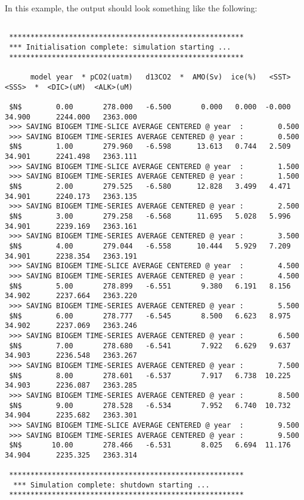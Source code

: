 \documentclass[11pt,fleqn]{book} %
\begin{document}
In this example, the output should look something like the following:

\newpage

\footnotesize
\begin{verbatim}

 *******************************************************
 *** Initialisation complete: simulation starting ...
 *******************************************************
    
      model year  * pCO2(uatm)   d13CO2  *  AMO(Sv)  ice(%)   <SST>   <SSS>  *  <DIC>(uM)  <ALK>(uM)
  
 $N$        0.00       278.000   -6.500       0.000   0.000  -0.000  34.900      2244.000   2363.000
 >>> SAVING BIOGEM TIME-SLICE AVERAGE CENTERED @ year  :        0.500
 >>> SAVING BIOGEM TIME-SERIES AVERAGE CENTERED @ year :        0.500
 $N$        1.00       279.960   -6.598      13.613   0.744   2.509  34.901      2241.498   2363.111
 >>> SAVING BIOGEM TIME-SLICE AVERAGE CENTERED @ year  :        1.500
 >>> SAVING BIOGEM TIME-SERIES AVERAGE CENTERED @ year :        1.500
 $N$        2.00       279.525   -6.580      12.828   3.499   4.471  34.901      2240.173   2363.135
 >>> SAVING BIOGEM TIME-SERIES AVERAGE CENTERED @ year :        2.500
 $N$        3.00       279.258   -6.568      11.695   5.028   5.996  34.901      2239.169   2363.161
 >>> SAVING BIOGEM TIME-SERIES AVERAGE CENTERED @ year :        3.500
 $N$        4.00       279.044   -6.558      10.444   5.929   7.209  34.901      2238.354   2363.191
 >>> SAVING BIOGEM TIME-SLICE AVERAGE CENTERED @ year  :        4.500
 >>> SAVING BIOGEM TIME-SERIES AVERAGE CENTERED @ year :        4.500
 $N$        5.00       278.899   -6.551       9.380   6.191   8.156  34.902      2237.664   2363.220
 >>> SAVING BIOGEM TIME-SERIES AVERAGE CENTERED @ year :        5.500
 $N$        6.00       278.777   -6.545       8.500   6.623   8.975  34.902      2237.069   2363.246
 >>> SAVING BIOGEM TIME-SERIES AVERAGE CENTERED @ year :        6.500
 $N$        7.00       278.680   -6.541       7.922   6.629   9.637  34.903      2236.548   2363.267
 >>> SAVING BIOGEM TIME-SERIES AVERAGE CENTERED @ year :        7.500
 $N$        8.00       278.601   -6.537       7.917   6.738  10.225  34.903      2236.087   2363.285
 >>> SAVING BIOGEM TIME-SERIES AVERAGE CENTERED @ year :        8.500
 $N$        9.00       278.528   -6.534       7.952   6.740  10.732  34.904      2235.682   2363.301
 >>> SAVING BIOGEM TIME-SLICE AVERAGE CENTERED @ year  :        9.500
 >>> SAVING BIOGEM TIME-SERIES AVERAGE CENTERED @ year :        9.500
 $N$       10.00       278.466   -6.531       8.025   6.694  11.176  34.904      2235.325   2363.314

 *******************************************************
  *** Simulation complete: shutdown starting ...
 *******************************************************

\end{verbatim}
\normalsize
\end{document}
